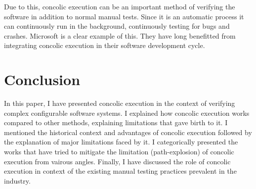 \documentclass[ runningheads,
               a4paper]{llncs}
\begin{document}
Due to this, concolic execution can be an important method of verifying the software in addition to normal manual tests. Since it is an automatic process it can continuously run in the background, continuously testing for bugs and crashes. Microsoft is a clear example of this. They have long benefitted \cite{godefroid2012sage} from integrating concolic execution in their software development cycle.






\section{Conclusion}
In this paper, I have presented concolic execution in the context of verifying complex configurable software systems. I explained how concolic execution works compared to other methods, explaining limitations that gave birth to it. I mentioned the historical context and advantages of concolic execution followed by the explanation of major limitations faced by it. I categorically presented the works that have tried to mitigate the limitation (path-explosion) of concolic execution from vairous angles. Finally, I have discussed the role of concolic execution in context of the existing manual testing practices prevalent in the industry.











  
\end{document}
